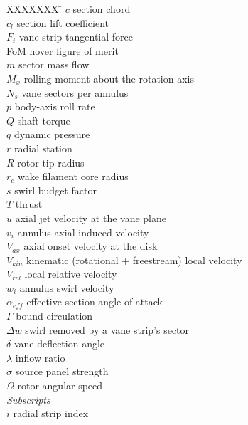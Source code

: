 \documentclass[]{aiaa-tc}%
\begin{document}
\begin{tabbing}
  XXXXXXX \= \kill%
  $c$        \> section chord \\
  $c_l$      \> section lift coefficient \\
  $F_t$      \> vane-strip tangential force \\
  FoM        \> hover figure of merit \\
  $\dot{m}$  \> sector mass flow \\
  $M_x$      \> rolling moment about the rotation axis \\
  $N_s$      \> vane sectors per annulus \\
  $p$        \> body-axis roll rate \\
  $Q$        \> shaft torque \\
  $q$        \> dynamic pressure \\
  $r$        \> radial station \\
  $R$        \> rotor tip radius \\
  $r_c$      \> wake filament core radius \\
  $s$        \> swirl budget factor \\
  $T$        \> thrust \\
  $u$        \> axial jet velocity at the vane plane \\
  $v_i$      \> annulus axial induced velocity \\
  $V_{ax}$   \> axial onset velocity at the disk \\
  $V_{kin}$  \> kinematic (rotational + freestream) local velocity \\
  $V_{rel}$  \> local relative velocity \\
  $w_i$      \> annulus swirl velocity \\
  $\alpha_{eff}$ \> effective section angle of attack \\
  $\Gamma$   \> bound circulation \\
  $\Delta w$ \> swirl removed by a vane strip's sector \\
  $\delta$   \> vane deflection angle \\
  $\lambda$  \> inflow ratio \\
  $\sigma$   \> source panel strength \\
  $\Omega$   \> rotor angular speed \\[5pt]
  \textit{Subscripts}\\
  $i$ \> radial strip index \\
 \end{tabbing}
\end{document}
